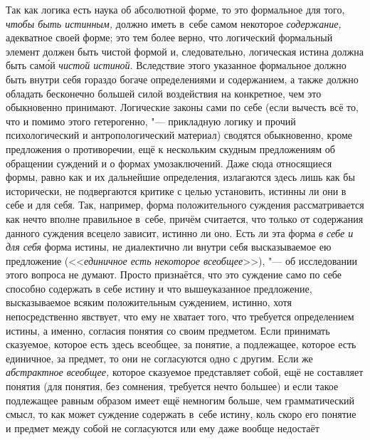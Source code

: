 Так как логика есть наука об абсолютной форме, то это
формальное для того, {\em чтобы быть истинным,}
должно иметь в~себе самом некоторое {\em содержание,}
адекватное своей форме; это тем более верно, что логический
формальный элемент должен быть чистой формой и, следовательно, логическая
истина должна быть сам\'{о}й {\em чистой истиной}.
Вследствие этого указанное формальное должно быть
внутри себя гораздо богаче определениями и содержанием, а также должно
обладать бесконечно большей силой воздействия на конкретное, чем это
обыкновенно принимают.
Логические законы сами по себе (если вычесть всё то, что и
помимо этого гетерогенно, "--- прикладную логику и прочий
психологический и антропологический материал) сводятся обыкновенно, кроме
предложения о противоречии, ещё к нескольким скудным предложениям об
обращении суждений и о формах умозаключений. Даже сюда относящиеся формы,
равно как и их дальнейшие определения, излагаются здесь лишь как бы
исторически, не подвергаются критике с целью установить, истинны ли они в
себе и для себя. Так, например, форма положительного суждения
рассматривается как нечто вполне правильное в~себе, причём
считается, что только от содержания данного суждения всецело зависит,
истинно ли оно. Есть ли эта форма {\em в
себе и для себя} форма истины, не диалектично ли внутри себя
высказываемое ею предложение (<<{\em единичное есть некоторое
всеобщее}>>), "--- об исследовании этого вопроса не думают. Просто
признаётся, что это суждение само по себе способно содержать в
себе истину и что вышеуказанное предложение, высказываемое всяким
положительным суждением, истинно, хотя непосредственно явствует, что ему не
хватает того, что требуется определением истины, а именно, согласия понятия
со своим предметом. Если принимать сказуемое, которое есть здесь всеобщее,
за понятие, а подлежащее, которое есть единичное, за предмет, то они не
согласуются одно с другим. Если же {\em абстрактное всеобщее,}
которое сказуемое представляет собой, ещё не составляет
понятия (для понятия, без сомнения, требуется нечто большее) и если такое
подлежащее равным образом имеет ещё немногим больше, чем грамматический
смысл, то как может суждение содержать в~себе истину, коль скоро его
понятие и предмет между собой не согласуются или ему даже вообще недостаёт
